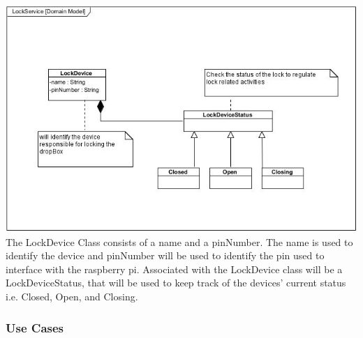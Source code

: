 \documentclass[a4paper,12pt]{article}
\begin{document}
	\includegraphics[width=1\textwidth]{./Pictures/UML/LockServiceDomain.jpg}\\[0cm]	
	
	{\noindent}The LockDevice Class consists of a name and a pinNumber. The name is used to identify the device and pinNumber will be used to identify the pin used to interface with the raspberry pi. Associated with the LockDevice class will be a LockDeviceStatus, that will be used to keep track of the devices' current status i.e. Closed, Open, and Closing.
	
	\newpage
	\subsubsection{Use Cases}
	
\end{document}
